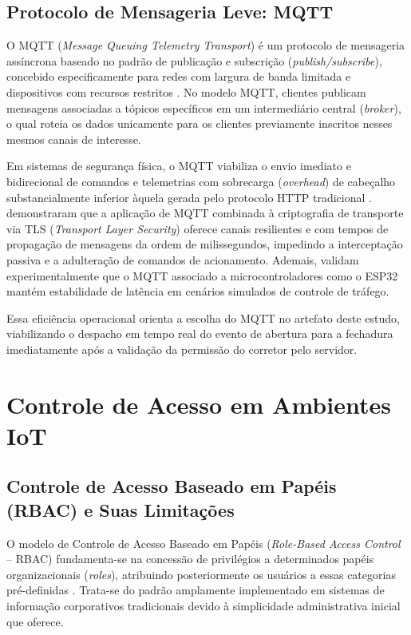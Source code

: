 \subsection{Protocolo de Mensageria Leve: MQTT}
\label{subsec:mqtt}

O MQTT (\textit{Message Queuing Telemetry Transport}) é um protocolo de mensageria assíncrona baseado no padrão de publicação e subscrição (\textit{publish/subscribe}), concebido especificamente para redes com largura de banda limitada e dispositivos com recursos restritos \cite{ameer2022}. No modelo MQTT, clientes publicam mensagens associadas a tópicos específicos em um intermediário central (\textit{broker}), o qual roteia os dados unicamente para os clientes previamente inscritos nesses mesmos canais de interesse.

Em sistemas de segurança física, o MQTT viabiliza o envio imediato e bidirecional de comandos e telemetrias com sobrecarga (\textit{overhead}) de cabeçalho substancialmente inferior àquela gerada pelo protocolo HTTP tradicional \cite{shauto2024}.  demonstraram que a aplicação de MQTT combinada à criptografia de transporte via TLS (\textit{Transport Layer Security}) oferece canais resilientes e com tempos de propagação de mensagens da ordem de milissegundos, impedindo a interceptação passiva e a adulteração de comandos de acionamento. Ademais,  validam experimentalmente que o MQTT associado a microcontroladores como o ESP32 mantém estabilidade de latência em cenários simulados de controle de tráfego.

Essa eficiência operacional orienta a escolha do MQTT no artefato deste estudo, viabilizando o despacho em tempo real do evento de abertura para a fechadura imediatamente após a validação da permissão do corretor pelo servidor.

\section{Controle de Acesso em Ambientes IoT}
\label{sec:controle-acesso}

\subsection{Controle de Acesso Baseado em Papéis (RBAC) e Suas Limitações}
\label{subsec:rbac}

O modelo de Controle de Acesso Baseado em Papéis (\textit{Role-Based Access Control} -- RBAC) fundamenta-se na concessão de privilégios a determinados papéis organizacionais (\textit{roles}), atribuindo posteriormente os usuários a essas categorias pré-definidas \cite{ameer2022}. Trata-se do padrão amplamente implementado em sistemas de informação corporativos tradicionais devido à simplicidade administrativa inicial que oferece.

